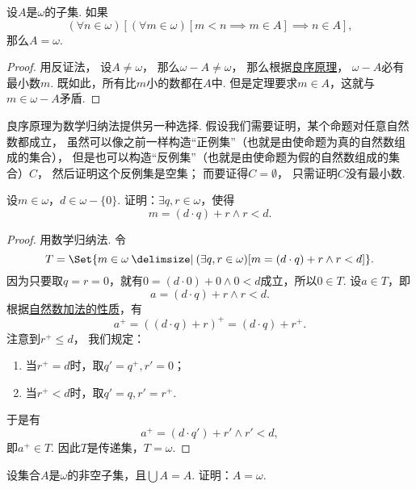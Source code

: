 \begin{theorem}[强归纳原理]\label{theorem:集合论.归纳原理2}
设\(A\)是\(\omega\)的子集.
如果\[
	(\forall n \in \omega)[
		(\forall m \in \omega)[m < n \implies m \in A]
		\implies
		n \in A
	],
\]
那么\(A = \omega\).
\begin{proof}
用反证法，
设\(A \neq \omega\)，
那么\(\omega - A \neq \omega\)，
那么根据\hyperref[theorem:集合论.自然数集的良序]{良序原理}，
\(\omega - A\)必有最小数\(m\).
既如此，所有比\(m\)小的数都在\(A\)中.
但是定理要求\(m \in A\)，这就与\(m \in \omega - A\)矛盾.
\end{proof}
\end{theorem}

良序原理为数学归纳法提供另一种选择.
假设我们需要证明，某个命题对任意自然数都成立，
虽然可以像之前一样构造“正例集”（也就是由使命题为真的自然数组成的集合），
但是也可以构造“反例集”（也就是由使命题为假的自然数组成的集合）\(C\)，
然后证明这个反例集是空集；
而要证得\(C = \emptyset\)，
只需证明\(C\)没有最小数.

\begin{example}
设\(m\in\omega\)，\(d\in\omega-\{0\}\).
证明：\(\exists q,r\in\omega\)，使得\[
	m=(d \cdot q)+r
	\land
	r<d.
\]
\begin{proof}
用数学归纳法.
令\[
	T = \Set{
		m \in \omega
		\given
		(\exists q,r\in\omega)[
			m=(d \cdot q)+r
			\land
			r<d
		]
	}.
\]
因为只要取\(q=r=0\)，就有\(0=(d\cdot0)+0\land0<d\)成立，所以\(0 \in T\).
设\(a \in T\)，即\[
	a = (d \cdot q) + r \land r < d.
\]
根据\hyperref[equation:集合论.自然数的加法.性质2]{自然数加法的性质}，有\[
	a^+ = ((d \cdot q) + r)^+
	= (d \cdot q) + r^+.
\]
注意到\(r^+ \leq d\)，
我们规定：\begin{enumerate}
	\item 当\(r^+=d\)时，取\(q'=q^+, r'=0\)；
	\item 当\(r^+<d\)时，取\(q'=q, r'=r^+\).
\end{enumerate}
于是有\[
	a^+ = (d \cdot q') + r'
	\land
	r' < d,
\]
即\(a^+ \in T\).
因此\(T\)是传递集，\(T = \omega\).
\end{proof}
\end{example}

\begin{example}
设集合\(A\)是\(\omega\)的非空子集，且\(\bigcup A = A\).
证明：\(A=\omega\).
\end{example}

